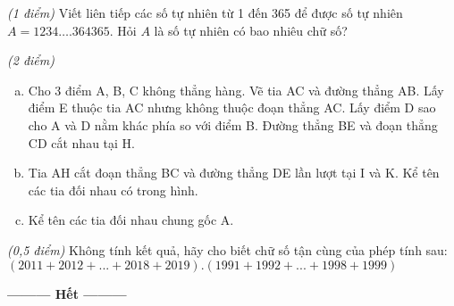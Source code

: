 \begin{ex}
\begin{enumerate}[a)]
\end{enumerate}
\end{ex}    \begin{ex}  \textit{(1 điểm)} Viết liên tiếp các số tự nhiên từ 1 đến 365 để được số tự nhiên 
$A = 1234….364365$. Hỏi $A$ là số tự nhiên có bao nhiêu chữ số?\\
\end{ex}    \begin{ex}  \textit{(2 điểm)}
 \begin{enumerate}[a)]
 \item Cho  3 điểm A, B, C không thẳng hàng. Vẽ tia AC và đường thẳng AB. Lấy điểm E thuộc tia AC nhưng không thuộc đoạn thẳng AC. Lấy điểm D sao cho A và D nằm khác phía so với điểm B. Đường thẳng BE và đoạn thẳng CD cắt nhau tại H.
\item Tia AH cắt đoạn thẳng BC và đường thẳng DE lần lượt tại I và K. Kể tên các tia đối nhau có trong hình.
\item Kể tên các tia đối nhau chung gốc A.
\end{enumerate}
\end{ex}    \begin{ex} \textit{(0,5 điểm)} Không tính kết quả, hãy cho biết chữ số tận cùng của phép tính sau:\\
$\left( 2011+2012+...+2018+2019 \right).\left( 1991+1992+...+1998+1999 \right)$
\end{ex}
\begin{center}
\textbf{\textbf{---------} Hết \textbf{---------}}
\end{center}